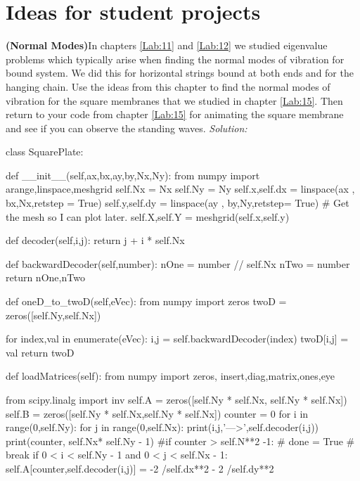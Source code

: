 \chapter{Ideas for student projects}
\label{Lab:20}

\begin{enumerate}
  \prob \textbf{(Normal Modes)}In chapters \ref{Lab:11} and \ref{Lab:12} we studied
  eigenvalue problems which typically arise when finding the normal
  modes of vibration for bound system.  We did this for horizontal
  strings bound at both ends and for the hanging chain.  Use the ideas
  from this chapter to find the normal modes of vibration for the
  square membranes that we studied in chapter \ref{Lab:15}.  Then
  return to your code from chapter \ref{Lab:15} for animating the
  square membrane and see if you can observe the standing waves.
\ifsolutions
\textit{Solution:}\\
\begin{codeexample}
\begin{VerbatimOut}{\listingFile}


class SquarePlate:


    def __init__(self,ax,bx,ay,by,Nx,Ny):
        from numpy import arange,linspace,meshgrid
        self.Nx = Nx
        self.Ny = Ny
        self.x,self.dx = linspace(ax , bx,Nx,retstep = True)
        self.y,self.dy = linspace(ay , by,Ny,retstep= True)
        # Get the mesh so I can plot later.
        self.X,self.Y = meshgrid(self.x,self.y)


    def decoder(self,i,j):
        return j + i * self.Nx

    def backwardDecoder(self,number):
        nOne = number // self.Nx
        nTwo = number %
        return nOne,nTwo
        

    def oneD_to_twoD(self,eVec):
        from numpy import zeros
        twoD = zeros([self.Ny,self.Nx])

        for index,val in enumerate(eVec):
            i,j = self.backwardDecoder(index)
            twoD[i,j] = val
        return twoD
    
    def loadMatrices(self):
        from numpy import zeros, insert,diag,matrix,ones,eye
        
        from scipy.linalg import inv
        self.A = zeros([self.Ny * self.Nx, self.Ny * self.Nx])
        self.B = zeros([self.Ny * self.Nx,self.Ny * self.Nx])
        counter = 0
        for i in range(0,self.Ny):
            for j in range(0,self.Nx):
                print(i,j,'--->',self.decoder(i,j))
                print(counter, self.Nx* self.Ny - 1)
                #if counter > self.N**2 -1:
                #    done = True
                #    break
                if 0 < i < self.Ny - 1 and 0 < j < self.Nx - 1:
                    self.A[counter,self.decoder(i,j)] = -2 /self.dx**2 - 2 /self.dy**2
                    

\end{VerbatimOut}
\end{codeexample}
\end{enumerate}

